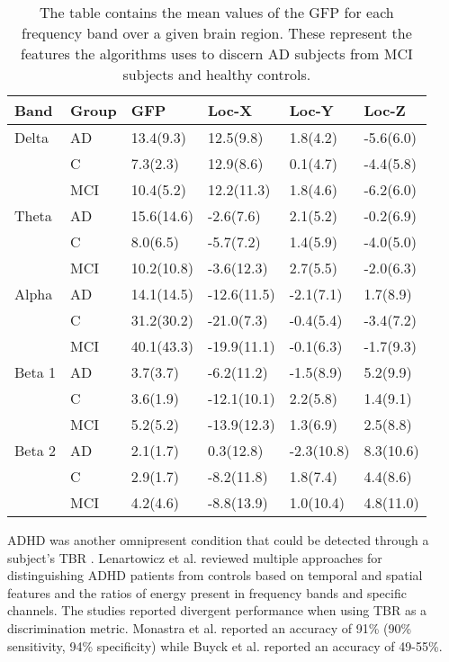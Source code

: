\begin{table}
\centering
\caption[Raw feature means for \acs{AD} classification.]{The table contains the mean values of the \ac{GFP} for each frequency band over a given brain region. These represent the features the algorithms uses to discern \ac{AD} subjects from \ac{MCI} subjects and healthy controls.}
\begin{tabular}{l l l l l l}
\toprule
Band		& Group	& GFP			& Loc-X		& Loc-Y		& Loc-Z\\
\midrule
Delta	& AD 	& 13.4(9.3)		& 12.5(9.8)	& 1.8(4.2) 	& -5.6(6.0) \\
		& C 		& 7.3(2.3)		& 12.9(8.6) 	& 0.1(4.7) 	& -4.4(5.8) \\
		& MCI	& 10.4(5.2)		& 12.2(11.3) 	& 1.8(4.6) 	& -6.2(6.0) \\
Theta	& AD 	& 15.6(14.6)		& -2.6(7.6) 	& 2.1(5.2) 	& -0.2(6.9) \\
		& C 		& 8.0(6.5)		& -5.7(7.2) 	& 1.4(5.9) 	& -4.0(5.0) \\
		& MCI	& 10.2(10.8)		& -3.6(12.3) 	& 2.7(5.5) 	& -2.0(6.3) \\
Alpha	& AD 	& 14.1(14.5)		& -12.6(11.5) & -2.1(7.1) 	& 1.7(8.9) \\
		& C 		& 31.2(30.2)		& -21.0(7.3) 	& -0.4(5.4) 	& -3.4(7.2) \\
		& MCI	& 40.1(43.3)		& -19.9(11.1) & -0.1(6.3) 	& -1.7(9.3) \\
Beta 1	& AD 	& 3.7(3.7) 		& -6.2(11.2) 	& -1.5(8.9) 	& 5.2(9.9) \\
		& C 		& 3.6(1.9) 		& -12.1(10.1) & 2.2(5.8) 	& 1.4(9.1) \\
		& MCI	& 5.2(5.2) 		& -13.9(12.3) & 1.3(6.9) 	& 2.5(8.8) \\
Beta 2	& AD 	& 2.1(1.7) 		& 0.3(12.8) 	& -2.3(10.8) 	& 8.3(10.6) \\
		& C 		& 2.9(1.7) 		& -8.2(11.8) 	& 1.8(7.4) 	& 4.4(8.6) \\
		& MCI	& 4.2(4.6) 		& -8.8(13.9) 	& 1.0(10.4) 	& 4.8(11.0) \\
\bottomrule
\end{tabular}
\label{tab:huang}
\end{table}

\ac{ADHD} was another omnipresent condition that could be detected through a subject's \ac{TBR} \cite{Lenartowicz2014}. Lenartowicz et al. \cite{Lenartowicz2014} reviewed multiple approaches for distinguishing \ac{ADHD} patients from controls based on temporal and spatial features and the ratios of energy present in frequency bands and specific channels. The studies reported divergent performance when using \ac{TBR} as a discrimination metric. Monastra et al. \cite{Monastra2001} reported an accuracy of 91\% (90\% sensitivity, 94\% specificity) while Buyck et al. \cite{Buyck2014} reported an accuracy of 49-55\%.
 

